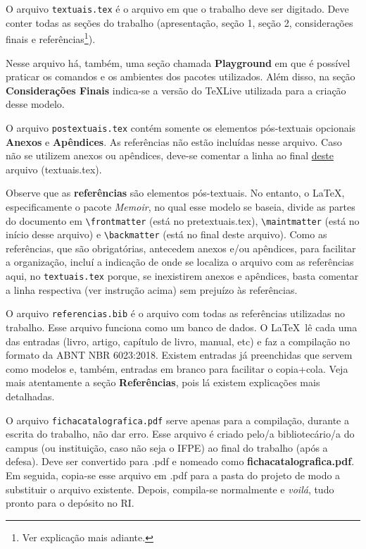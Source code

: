 O arquivo \verb|textuais.tex| é o arquivo em que o trabalho deve ser digitado. Deve conter todas as seções do trabalho (apresentação, seção 1, seção 2, considerações finais e referências\footnote{Ver explicação mais adiante.}).

Nesse arquivo há, também, uma seção chamada \textbf{Playground} em que é possível praticar os comandos e os ambientes dos pacotes utilizados. Além disso, na seção \textbf{Considerações Finais} indica-se a versão do \TeX Live utilizada para a criação desse modelo.

O arquivo \verb|postextuais.tex| contém somente os elementos pós-textuais opcionais \textbf{Anexos} e \textbf{Apêndices}. As referências não estão incluídas nesse arquivo. Caso não se utilizem anexos ou apêndices, deve-se comentar a linha \verb|| ao final \underline{deste} arquivo (textuais.tex).

Observe que as \textbf{referências} são elementos pós-textuais. No entanto, o \LaTeX, especificamente o pacote \textit{Memoir}, no qual esse modelo se baseia, divide as partes do documento em \verb|\frontmatter| (está no pretextuais.tex), \verb|\maintmatter| (está no início desse arquivo) e \verb|\backmatter| (está no final deste arquivo). Como as referências, que são obrigatórias, antecedem anexos e/ou apêndices, para facilitar a organização, incluí a indicação de onde se localiza o arquivo com as referências aqui, no \verb|textuais.tex| porque, se inexistirem anexos e apêndices, basta comentar a linha respectiva (ver instrução acima) sem prejuízo às referências.

O arquivo \verb|referencias.bib| é o arquivo com todas as referências utilizadas no trabalho. Esse arquivo funciona como um banco de dados. O \LaTeX\ lê cada uma das entradas (livro, artigo, capítulo de livro, manual, etc) e faz a compilação no formato da ABNT NBR 6023:2018. Existem entradas já preenchidas que servem como modelos e, também, entradas em branco para facilitar o copia+cola. Veja mais atentamente a seção \textbf{Referências}, pois lá existem explicações mais detalhadas.

O arquivo \verb|fichacatalografica.pdf| serve apenas para a compilação, durante a escrita do trabalho, não dar erro. Esse arquivo é criado pelo/a bibliotecário/a do campus (ou instituição, caso não seja o IFPE) ao final do trabalho (após a defesa). Deve ser convertido para .pdf e nomeado como \textbf{fichacatalografica.pdf}. Em seguida, copia-se esse arquivo em .pdf para a pasta do projeto de modo a substituir o arquivo existente. Depois, compila-se normalmente e \textit{voilá}, tudo pronto para o depósito no RI.

